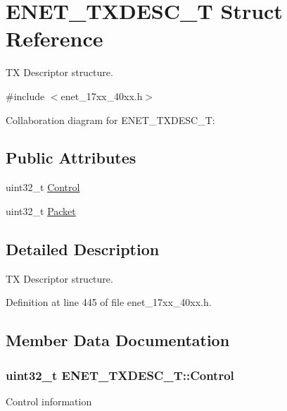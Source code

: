 \hypertarget{structENET__TXDESC__T}{}\section{E\+N\+E\+T\+\_\+\+T\+X\+D\+E\+S\+C\+\_\+T Struct Reference}
\label{structENET__TXDESC__T}


TX Descriptor structure.  




{\ttfamily \#include $<$enet\+\_\+17xx\+\_\+40xx.\+h$>$}



Collaboration diagram for E\+N\+E\+T\+\_\+\+T\+X\+D\+E\+S\+C\+\_\+T\+:
\subsection*{Public Attributes}
\begin{DoxyCompactItemize}
\item 
uint32\+\_\+t \hyperlink{structENET__TXDESC__T_a7bbcf3f7943ab87b784dbca19e2698d5}{Control}
\item 
uint32\+\_\+t \hyperlink{structENET__TXDESC__T_aa32276326b2e5e4157e59d0f5553bae3}{Packet}
\end{DoxyCompactItemize}


\subsection{Detailed Description}
TX Descriptor structure. 

Definition at line 445 of file enet\+\_\+17xx\+\_\+40xx.\+h.



\subsection{Member Data Documentation}
\subsubsection[{\texorpdfstring{Control}{Control}}]{\setlength{\rightskip}{0pt plus 5cm}uint32\+\_\+t E\+N\+E\+T\+\_\+\+T\+X\+D\+E\+S\+C\+\_\+\+T\+::\+Control}\hypertarget{structENET__TXDESC__T_a7bbcf3f7943ab87b784dbca19e2698d5}{}\label{structENET__TXDESC__T_a7bbcf3f7943ab87b784dbca19e2698d5}
Control information 

